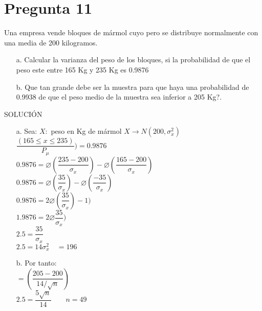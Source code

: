 \documentclass[10pt,a4paper]{article}
\begin{document}
\section{Pregunta 11}
Una empresa vende bloques de mármol cuyo pero se distribuye normalmente con una media de 200 kilogramos.
\begin{itemize}
\item[a.]Calcular la varianza del peso de los bloques, si la probabilidad de que el peso este entre 165 Kg y 235 Kg es 0.9876
\item[b.]Que tan grande debe ser la muestra para que haya una probabilidad de 0.9938 de que el peso medio de la muestra sea inferior a 205 Kg?.
\end{itemize}
SOLUCIÓN\\
\begin{itemize}
\item[a.]
Sea:
$X : $ peso en Kg de mármol 
$X \rightarrow N(200, \sigma_{x}^2)$\\
\newline
$\dfrac{(165 \leq x \leq 235)}{P_{\mu}}) = 0.9876$\\
\newline
$0.9876 =\varnothing(\dfrac{235-200}{\sigma_{x}}) - \varnothing(\dfrac{165-200}{\sigma_{x}})$\\
\newline
$0.9876 =\varnothing(\dfrac{35}{\sigma_{x}}) - \varnothing(\dfrac{-35}{\sigma_{x}})$\\
\newline
$0.9876 = 2 \varnothing(\dfrac{35}{\sigma_{x}}) - 1)$\\
\newline
$1.9876 = 2 \varnothing\dfrac{35}{\sigma_{x}})$\\
\newline
$2.5 = \dfrac{35}{\sigma_{x}}$\\
\newline
$2.5 = 14\sigma_{x}^2 \quad  = 196$\\
\item[b.] Por tanto:\\
\newline
$= (\dfrac{205-200}{14/\sqrt{n}})$\\
\newline
$2.5 = \dfrac{5\sqrt{n}}{14}\qquad n = 49$
\end{itemize}
\end{document}
